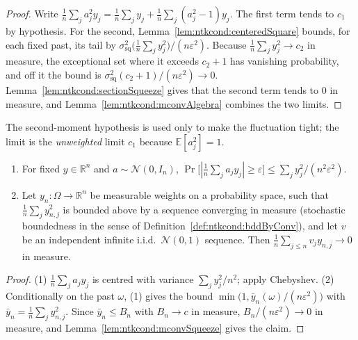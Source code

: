 \begin{proof}
  \leanok
Write $\frac1n\sum_ja_j^2y_j=\frac1n\sum_jy_j+\frac1n\sum_j(a_j^2-1)y_j$. The first term tends to $c_1$ by hypothesis. For the second, Lemma~\ref{lem:ntkcond:centeredSquare} bounds, for each fixed past, its tail by $\sigma_{\mathrm{sq}}^2\bigl(\tfrac1n\sum_jy_j^2\bigr)/(n\varepsilon^2)$. Because $\tfrac1n\sum_jy_j^2\to c_2$ in measure, the exceptional set where it exceeds $c_2+1$ has vanishing probability, and off it the bound is $\sigma_{\mathrm{sq}}^2(c_2+1)/(n\varepsilon^2)\to0$. Lemma~\ref{lem:ntkcond:sectionSqueeze} gives that the second term tends to $0$ in measure, and Lemma~\ref{lem:ntkcond:mconvAlgebra} combines the two limits.
\end{proof}

The second-moment hypothesis is used only to make the fluctuation tight; the limit is the \emph{unweighted} limit $c_1$ because $\mathbb E[a_j^2]=1$.

\begin{theorem}\label{thm:ntkcond:linearAverage}
  \leanok
\begin{enumerate}
  \item For fixed $y\in\mathbb R^n$ and $a\sim\mathcal N(0,I_n)$, $\Pr\bigl[|\frac1n\sum_ja_jy_j|\ge\varepsilon\bigr]\le\sum_jy_j^2/(n^2\varepsilon^2)$.
  \item Let $y_n:\Omega\to\mathbb R^n$ be measurable weights on a probability space, such that $\frac1n\sum_jy_{n,j}^2$ is bounded above by a sequence converging in measure (stochastic boundedness in the sense of Definition~\ref{def:ntkcond:bddByConv}), and let $v$ be an independent infinite i.i.d.\ $\mathcal N(0,1)$ sequence. Then $\frac1n\sum_{j\le n}v_jy_{n,j}\to0$ in measure.
\end{enumerate}
\end{theorem}

\begin{proof}
  \leanok
(1) $\frac1n\sum_ja_jy_j$ is centred with variance $\sum_jy_j^2/n^2$; apply Chebyshev. (2) Conditionally on the past $\omega$, (1) gives the bound $\min\bigl(1,\bar y_n(\omega)/(n\varepsilon^2)\bigr)$ with $\bar y_n=\frac1n\sum_jy_{n,j}^2$. Since $\bar y_n\le B_n$ with $B_n\to c$ in measure, $B_n/(n\varepsilon^2)\to0$ in measure, and Lemma~\ref{lem:ntkcond:mconvSqueeze} gives the claim.
\end{proof}


